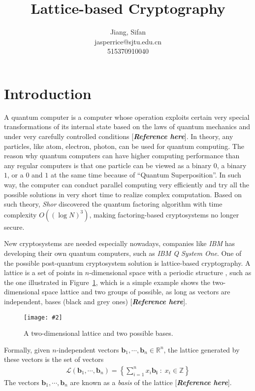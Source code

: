 \documentclass[11pt,a4paper]{article}
\title{
	Lattice-based Cryptography
}
\author{
	Jiang, Sifan\\
	jasperrice@sjtu.edu.cn\\
	515370910040
}
\newcommand{\image}[3]{
	\begin{figure}[!ht]
		\centering
	    \texttt{[image: \#2]}
		\caption{#3}
		\label{fig:#2}
	\end{figure}
}
\begin{document}
\maketitle

\section{Introduction}
\par A quantum computer is a computer whose operation exploits certain very special transformations of its internal state based on the laws of quantum mechanics and under very carefully controlled conditions [\textit{\textbf{Reference here}}]. In theory, any particles, like atom, electron, photon, can be used for quantum computing. The reason why quantum computers can have higher computing performance than any regular computers is that one particle can be viewed as a binary $0$, a binary $1$, or a $0$ and $1$ at the same time because of ``Quantum Superposition''. In such way, the computer can conduct parallel computing very efficiently and try all the possible solutions in very short time to realize complex computation. Based on such theory, \textit{Shor} discovered the quantum factoring algorithm with time complexity $O((\log N)^{3})$, making factoring-based cryptosystems no longer secure.
\par New cryptosystems are needed especially nowadays, companies like \textit{IBM} has developing their own quantum computers, such as \textit{IBM Q System One}. One of the possible post-quantum cryptosystem solution is lattice-based cryptography. A lattice is a set of points in $n$-dimensional space with a periodic structure , such as the one illustrated in Figure~\ref{fig:2dlattice}, which is a simple example shows the two-dimensional space lattice and two groups of possible, as long as vectors are independent, bases (black and grey ones) [\textit{\textbf{Reference here}}].
\image{0.5}{2dlattice}{A two-dimensional lattice and two possible bases.}
\par Formally, given $n$-independent vectors $\mathbf{b}_{1}, \cdots, \mathbf{b}_{n} \in \mathbb{R}^{n}$, the lattice generated by these vectors is the set of vectors
\begin{align*}
	\mathcal{L}(\mathbf{b}_{1}, \cdots, \mathbf{b}_{n}) = \left\lbrace \sum_{i=1}^{n} x_{i}\mathbf{b_{i}} \; : \; x_{i} \in \mathbb{Z} \right\rbrace
\end{align*}
The vectors $\mathbf{b}_{1}, \cdots, \mathbf{b}_{n}$ are known as a \textit{basis} of the lattice [\textit{\textbf{Reference here}}].
\end{document}
